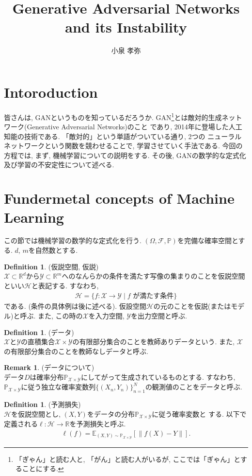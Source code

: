 \documentclass[11pt, a4paper, dvipdfmx]{jsarticle}
\title{Generative Adversarial Networks and its Instability}
\author{小泉 孝弥}
\date{}
\theoremstyle{definition}
\newtheorem{Definition+}[Axiom+]{Definition}
\newtheorem{Remark+}[Axiom+]{Remark}
\newcommand{\R}{\mathbb{R}}
\newcommand{\F}{\mathcal{F}}
\newcommand{\X}{\mathcal{X}}
\newcommand{\Y}{\mathcal{Y}}
\newcommand{\Hil}{\mathcal{H}}
\renewcommand{\P}{\mathbb{P}}
\newcommand{\Probsp}{(\Omega, \F, \P)}
\begin{document}
\maketitle
\section{Intoroduction}
皆さんは, GANというものを知っているだろうか. GAN\footnote{「ぎゃん」と読む人と, 「がん」と読む人がいるが, ここでは「ぎゃん」とすることにする.}とは敵対的生成ネットワーク(Generative Adversarial Networks)のこと
であり, 2014年に登場した人工知能の技術である. 「敵対的」という単語がついている通り, 2つの
ニューラルネットワークという関数を競わせることで, 学習させていく手法である. 
今回の方程では, まず, 機械学習についての説明をする. その後, GANの数学的な定式化及び学習の不安定性について述べる.
\section{Fundermetal concepts of Machine Learning}
この節では機械学習の数学的な定式化を行う. $\Probsp$を完備な確率空間とする.
$d$, $m$を自然数とする.
\begin{Definition+}(仮説空間, 仮説)\\
    $\X\subset\R^d$から$\Y\subset\R^m$へのなんらかの条件を満たす写像の集まりのことを仮説空間
    といい$\Hil$と表記する. すなわち,
    \begin{align*}
        \Hil = \{f:\X\to\Y\mid f\text{ が満たす条件}\}
    \end{align*}
    である. (条件の具体例は後に述べる). 仮設空間$\Hil$の元のことを仮説(またはモデル)と呼ぶ.
    また, この時の$\X$を入力空間, $\Y$を出力空間と呼ぶ. 
\end{Definition+}
\begin{Definition+}(データ)\\
    $\X$と$\Y$の直積集合$\X\times\Y$の有限部分集合のことを教師ありデータという.
    また, $\X$の有限部分集合のことを教師なしデータと呼ぶ. 
\end{Definition+}
\begin{Remark+}(データについて)\\
    データ$D$は確率分布$\mathbb{P}_{\X\times\Y}$にしてがって生成されているものとする. すなわち, 
    $\mathbb{P}_{\X\times\Y}$に従う独立な確率変数列$\{(X_{n}, Y_{n})\}_{n = 1}^{N}$の観測値のことをデータと呼ぶ.
\end{Remark+}
\begin{Definition+}(予測損失)\\
    $\Hil$を仮説空間とし, $(X, Y)$をデータの分布$\mathbb{P}_{\X\times\Y}$に従う確率変数と
    する. 以下で定義される$\ell:\Hil\to\R$を予測損失と呼ぶ.
    \begin{align*}
        \ell(f) = \mathbb{E}_{(X, Y)\sim\mathbb{P}_{\X\times\Y}}[\|f(X) - Y\|].
    \end{align*}
\end{Definition+}
\end{document}
